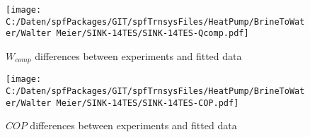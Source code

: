 \documentclass[english]{SPFShortReport}
\begin{document}
\begin{figure}[!ht]
\begin{center}
\texttt{[image: C:/Daten/spfPackages/GIT/spfTrnsysFiles/HeatPump/BrineToWater/Walter Meier/SINK-14TES/SINK-14TES-Qcomp.pdf]}
\caption{$W_{comp}$ differences between experiments and fitted data}
\label{QcompFig}
\end{center}
\end{figure}
\begin{figure}[!ht]
\begin{center}
\texttt{[image: C:/Daten/spfPackages/GIT/spfTrnsysFiles/HeatPump/BrineToWater/Walter Meier/SINK-14TES/SINK-14TES-COP.pdf]}
\caption{$COP$ differences between experiments and fitted data}
\label{COPFig}
\end{center}
\end{figure}
\end{document}
